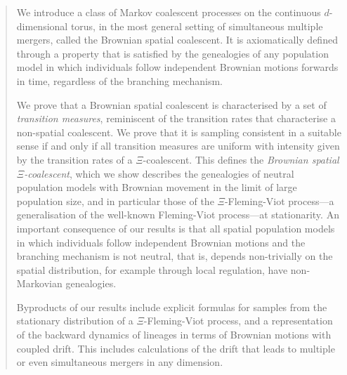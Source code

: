 \documentclass[reqno,draft]{amsart}
\numberwithin{equation}{section}
\theoremstyle{plain}
\theoremstyle{remark}
\begin{document}
\begin{abstract}

    We introduce a class of Markov coalescent processes on the continuous $d$-dimensional torus, in the most general setting of simultaneous multiple mergers, called the Brownian spatial coalescent. It is axiomatically defined through a property that is satisfied by the genealogies of any population model in which individuals follow independent Brownian motions forwards in time, regardless of the branching mechanism.

    We prove that a Brownian spatial coalescent is characterised by a set of \emph{transition measures}, reminiscent of the transition rates that characterise a non-spatial coalescent.
    We prove that it is sampling consistent in a suitable sense if and only if all transition measures are uniform with intensity given by the transition rates of a $\Xi$-coalescent. %
    This defines the \emph{Brownian spatial $\Xi$-coalescent}, which we show describes the genealogies of neutral population models with Brownian movement in the limit of large population size, and in particular those of the $\Xi$-Fleming-Viot process---a generalisation of the well-known Fleming-Viot process---at stationarity.
%
    An important consequence of our results is that all spatial population models in which individuals follow independent Brownian motions and the branching mechanism is not neutral, that is, depends non-trivially on the spatial distribution, for example through local regulation, have non-Markovian genealogies.

    Byproducts of our results include explicit formulas for samples from the stationary distribution of a $\Xi$-Fleming-Viot process, and a representation of the backward dynamics of lineages in terms of Brownian motions with coupled drift. This includes calculations of the drift that leads to multiple or even simultaneous mergers in any dimension.

\end{abstract}
\end{document}
